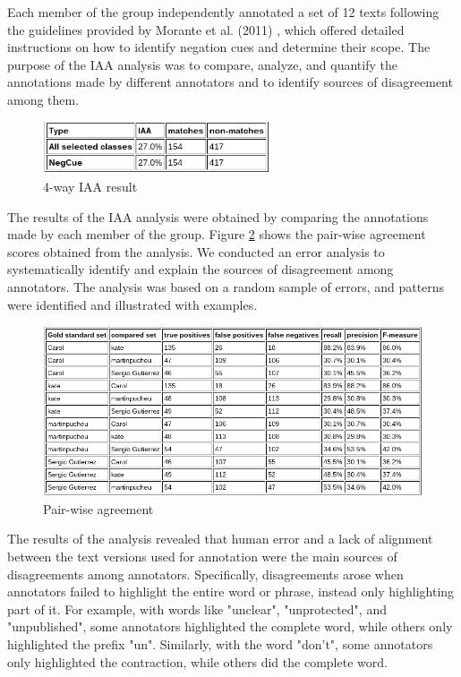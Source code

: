 Each member of the group independently annotated a set of 12 texts following the guidelines provided by Morante et al. (2011) \cite{morante2011annotation}, which offered detailed instructions on how to identify negation cues and determine their scope. The purpose of the IAA analysis was to compare, analyze, and quantify the annotations made by different annotators and to identify sources of disagreement among them.

\begin{figure}[!h]
\begin{center}
  \includegraphics[width=0.6\textwidth]{Plots and results/4way.png}
  \caption{4-way IAA result}
  \label{fig:4way}
\end{center}  
\end{figure}

The results of the IAA analysis were obtained by comparing the annotations made by each member of the group. Figure \ref{fig:Pairwise agreement} shows the pair-wise agreement scores obtained from the analysis. We conducted an error analysis to systematically identify and explain the sources of disagreement among annotators. The analysis was based on a random sample of errors, and patterns were identified and illustrated with examples.

\begin{figure}[!h]
  \includegraphics[width=\linewidth]{Plots and results/pairwise.png}
  \caption{Pair-wise agreement}
  \label{fig:Pairwise agreement}
\end{figure}

The results of the analysis revealed that human error and a lack of alignment between the text versions used for annotation were the main sources of disagreements among annotators. Specifically, disagreements arose when annotators failed to highlight the entire word or phrase, instead only highlighting part of it. For example, with words like "unclear", "unprotected", and "unpublished", some annotators highlighted the complete word, while others only highlighted the prefix "un". Similarly, with the word "don't", some annotators only highlighted the contraction, while others did the complete word. 

